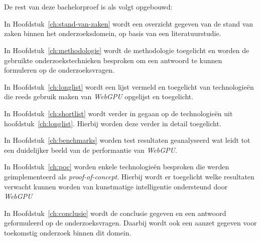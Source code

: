 \break{}

\section{}%
\label{sec:opzet-bachelorproef}


De rest van deze bachelorproef is als volgt opgebouwd:

In Hoofdstuk~\ref{ch:stand-van-zaken} wordt een overzicht gegeven van de stand van zaken binnen het onderzoeksdomein, op basis van een literatuurstudie.

\bigbreak{}

In Hoofdstuk~\ref{ch:methodologie} wordt de methodologie toegelicht en worden de gebruikte onderzoekstechnieken besproken om een antwoord te kunnen formuleren op de onderzoeksvragen.

\bigbreak{}

In Hoofdstuk~\ref{ch:longlist} wordt een lijst vermeld en toegelicht van technologieën die reeds gebruik maken van \textit{WebGPU} opgelijst en toegelicht.

\bigbreak{}

In Hoofdstuk~\ref{ch:shortlist} wordt verder in gegaan op de technologieën uit hoofdstuk~\ref{ch:longlist}. Hierbij worden deze verder in detail toegelicht.

\bigbreak{}

In Hoofdstuk~\ref{ch:benchmarks} worden test resultaten geanalyseerd wat leidt tot een duidelijker beeld van de performantie van \textit{WebGPU}.

\bigbreak{}

In Hoofdstuk~\ref{ch:poc} worden enkele technologieën besproken die werden geimplementeerd als \textit{proof-of-concept}. Hierbij wordt er toegelicht welke resultaten verwacht kunnen worden van kunstmatige intelligentie ondersteund door \textit{WebGPU}

\bigbreak{}

In Hoofdstuk~\ref{ch:conclusie} wordt de conclusie gegeven en een antwoord geformuleerd op de onderzoeksvragen. Daarbij wordt ook een aanzet gegeven voor toekomstig onderzoek binnen dit domein.